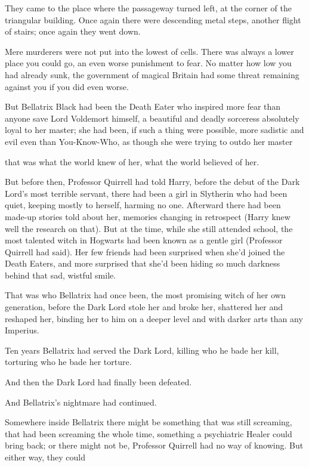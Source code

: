 They came to the place where the passageway turned left, at the corner of the
triangular building. Once again there were descending metal steps, another
flight of stairs; once again they went down.

Mere murderers were not put into the lowest of cells. There was always a lower
place you could go, an even worse punishment to fear. No matter how low you had
already sunk, the government of magical Britain had some threat remaining
against you if you did even worse.

But Bellatrix Black had been the Death Eater who inspired more fear than anyone
save Lord Voldemort himself, a beautiful and deadly sorceress absolutely loyal
to her master; she had been, if such a thing were possible, more sadistic and
evil even than You-Know-Who, as though she were trying to outdo her
master{\el}

{\el} that was what the world knew of her, what the world believed of her.

But before then, Professor Quirrell had told Harry, before the debut of the
Dark Lord's most terrible servant, there had been a girl in Slytherin who had
been quiet, keeping mostly to herself, harming no one. Afterward there had been
made-up stories told about her, memories changing in retrospect (Harry knew
well the research on that). But at the time, while she still attended school,
the most talented witch in Hogwarts had been known as a gentle girl (Professor
Quirrell had said). Her few friends had been surprised when she'd joined the
Death Eaters, and more surprised that she'd been hiding so much darkness behind
that sad, wistful smile.

That was who Bellatrix had once been, the most promising witch of her own
generation, before the Dark Lord stole her and broke her, shattered her and
reshaped her, binding her to him on a deeper level and with darker arts than
any Imperius.

Ten years Bellatrix had served the Dark Lord, killing who he bade her kill,
torturing who he bade her torture.

And then the Dark Lord had finally been defeated.

And Bellatrix's nightmare had continued.

Somewhere inside Bellatrix there might be something that was still screaming,
that had been screaming the whole time, something a psychiatric Healer could
bring back; or there might not be, Professor Quirrell had no way of knowing.
But either way, they could{\el}

